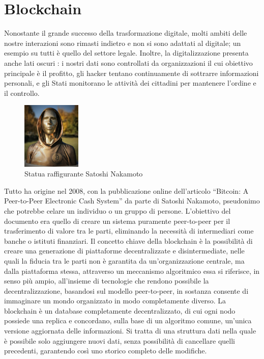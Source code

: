 \chapter{Blockchain}

Nonostante il grande successo della trasformazione digitale, molti ambiti delle nostre interazioni sono rimasti indietro e non si sono adattati al digitale; un esempio su tutti è quello del settore legale. Inoltre, la digitalizzazione presenta anche lati oscuri \cite{La_quarta_rivoluzione_industriale}: i nostri dati sono controllati da organizzazioni il cui obiettivo principale è il profitto, gli hacker tentano continuamente di sottrarre informazioni personali, e gli Stati monitorano le attività dei cittadini per mantenere l’ordine e il controllo.
\begin{figure} %
    \centering
    \includegraphics[width=0.25\textwidth]{Immagini/Satoshi_Nakamoto.jpg}
    \caption{Statua raffigurante Satoshi Nakamoto}
\end{figure}
Tutto ha origine nel 2008, con la pubblicazione online dell’articolo “Bitcoin: A Peer-to-Peer Electronic Cash System” da parte di Satoshi Nakamoto, pseudonimo che potrebbe celare un individuo o un gruppo di persone. L’obiettivo del documento era quello di creare un sistema puramente peer-to-peer per il trasferimento di valore tra le parti, eliminando la necessità di intermediari come banche o istituti finanziari.
Il concetto chiave della blockchain è la possibilità di creare una generazione di piattaforme decentralizzate e disintermediate, nelle quali la fiducia tra le parti non è garantita da un’organizzazione centrale, ma dalla piattaforma stessa, attraverso un meccanismo algoritmico essa si riferisce, in senso più ampio, all’insieme di tecnologie che rendono possibile la decentralizzazione, basandosi sul modello peer-to-peer, in sostanza consente di immaginare un mondo organizzato in modo completamente diverso.
La blockchain è un database completamente decentralizzato, di cui ogni nodo possiede una replica e concordano, sulla base di un algoritmo comune, un’unica versione aggiornata delle informazioni. Si tratta di una struttura dati nella quale è possibile solo aggiungere nuovi dati, senza possibilità di cancellare quelli precedenti, garantendo così uno storico completo delle modifiche.
